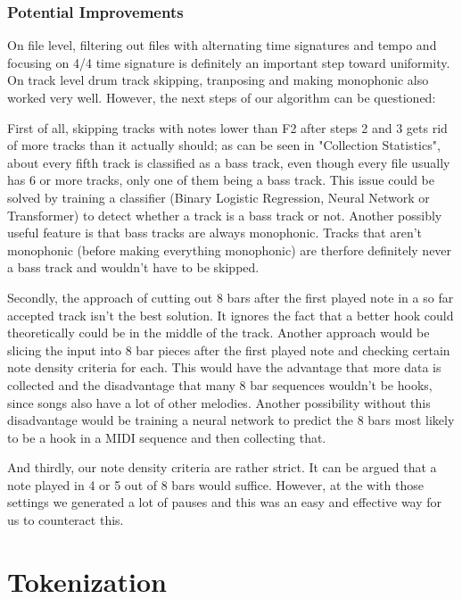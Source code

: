 \documentclass[a4paper,12pt]{extarticle}
\begin{document}
\subsubsection{Potential Improvements}

On file level, filtering out files with alternating time signatures and tempo and focusing on 4/4 time signature is definitely an important step toward uniformity.
On track level drum track skipping, tranposing and making monophonic also worked very well.
However, the next steps of our algorithm can be questioned: \newline

First of all, skipping tracks with notes lower than F2 after steps 2 and 3 gets rid
of more tracks than it actually should; as can be seen in "Collection Statistics",
about every fifth track is classified as a bass track, even though every file usually has 6 or more tracks, only one of them being a bass track.
This issue could be solved by training a classifier (Binary Logistic Regression, Neural Network or Transformer) to detect whether a track is a bass track or not.
Another possibly useful feature is that bass tracks are always monophonic. Tracks that aren't monophonic (before making everything monophonic) are therfore definitely never a bass track and wouldn't have to be skipped. \newline

Secondly, the approach of cutting out 8 bars after the first played note in a so far accepted track isn't the best solution.
It ignores the fact that a better hook could theoretically could be in the middle of the track. 
Another approach would be slicing the input into 8 bar pieces after the first played note and checking certain note density criteria for each.
This would have the advantage that more data is collected and the disadvantage that many 8 bar sequences wouldn't be hooks, since songs also have a lot of other melodies.
Another possibility without this disadvantage would be training a neural network to predict the 8 bars most likely to be a hook in a MIDI sequence and then collecting that. \newline

And thirdly, our note density criteria are rather strict. It can be argued that a note played in 4 or 5 out of 8 bars would suffice.
However, at the with those settings we generated a lot of pauses and this was an easy and effective way for us to counteract this.


\section{Tokenization}
\end{document}
